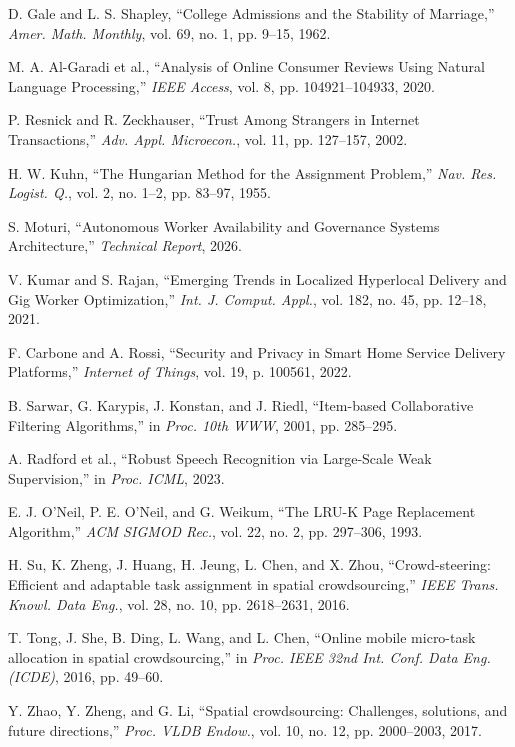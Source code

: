 \documentclass[10pt,twocolumn,a4paper]{article}
\begin{document}
\noindent
[9] D. Gale and L. S. Shapley, ``College Admissions and the Stability of Marriage,'' \textit{Amer. Math. Monthly}, vol. 69, no. 1, pp. 9--15, 1962.

\noindent
[10] M. A. Al-Garadi et al., ``Analysis of Online Consumer Reviews Using Natural Language Processing,'' \textit{IEEE Access}, vol. 8, pp. 104921--104933, 2020.

\noindent
[11] P. Resnick and R. Zeckhauser, ``Trust Among Strangers in Internet Transactions,'' \textit{Adv. Appl. Microecon.}, vol. 11, pp. 127--157, 2002.

\noindent
[12] H. W. Kuhn, ``The Hungarian Method for the Assignment Problem,'' \textit{Nav. Res. Logist. Q.}, vol. 2, no. 1--2, pp. 83--97, 1955.

\noindent
[13] S. Moturi, ``Autonomous Worker Availability and Governance Systems Architecture,'' \textit{Technical Report}, 2026.

\noindent
[14] V. Kumar and S. Rajan, ``Emerging Trends in Localized Hyperlocal Delivery and Gig Worker Optimization,'' \textit{Int. J. Comput. Appl.}, vol. 182, no. 45, pp. 12--18, 2021.

\noindent
[15] F. Carbone and A. Rossi, ``Security and Privacy in Smart Home Service Delivery Platforms,'' \textit{Internet of Things}, vol. 19, p. 100561, 2022.

\noindent
[16] B. Sarwar, G. Karypis, J. Konstan, and J. Riedl, ``Item-based Collaborative Filtering Algorithms,'' in \textit{Proc. 10th WWW}, 2001, pp. 285--295.

\noindent
[17] A. Radford et al., ``Robust Speech Recognition via Large-Scale Weak Supervision,'' in \textit{Proc. ICML}, 2023.

\noindent
[18] E. J. O'Neil, P. E. O'Neil, and G. Weikum, ``The LRU-K Page Replacement Algorithm,'' \textit{ACM SIGMOD Rec.}, vol. 22, no. 2, pp. 297--306, 1993.

\noindent
[19] H. Su, K. Zheng, J. Huang, H. Jeung, L. Chen, and X. Zhou, ``Crowd-steering: Efficient and adaptable task assignment in spatial crowdsourcing,'' \textit{IEEE Trans. Knowl. Data Eng.}, vol. 28, no. 10, pp. 2618--2631, 2016.

\noindent
[20] T. Tong, J. She, B. Ding, L. Wang, and L. Chen, ``Online mobile micro-task allocation in spatial crowdsourcing,'' in \textit{Proc. IEEE 32nd Int. Conf. Data Eng. (ICDE)}, 2016, pp. 49--60.

\noindent
[21] Y. Zhao, Y. Zheng, and G. Li, ``Spatial crowdsourcing: Challenges, solutions, and future directions,'' \textit{Proc. VLDB Endow.}, vol. 10, no. 12, pp. 2000--2003, 2017.
\end{document}
